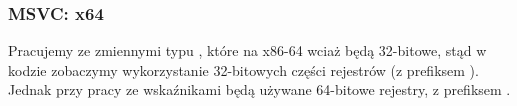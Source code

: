 \subsubsection{MSVC: x64}


Pracujemy ze zmiennymi typu \Tint{}, które na x86-64 wciaż będą 32-bitowe, stąd w kodzie zobaczymy wykorzystanie 32-bitowych części rejestrów (z prefiksem ).
Jednak przy pracy ze wskaźnikami będą używane 64-bitowe rejestry, z prefiksem .



